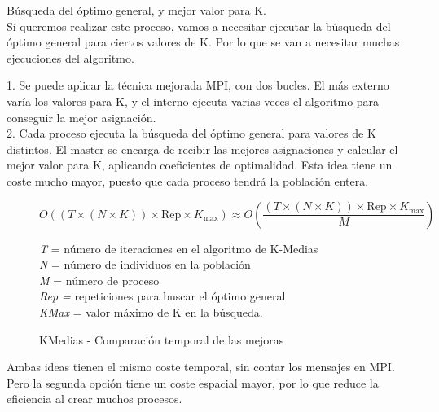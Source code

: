 		\vspace{0.2cm}
		
		\noindent Búsqueda del óptimo general, y mejor valor para K.\\
		Si queremos realizar este proceso, vamos a necesitar ejecutar la búsqueda del óptimo general para ciertos valores de K. Por lo que se van a necesitar muchas ejecuciones del algoritmo.
		
		\begin{flushleft}
			1. Se puede aplicar la técnica mejorada MPI, con dos bucles. El más externo varía los valores para K, y el interno ejecuta varias veces el algoritmo para conseguir la mejor asignación.\\
			2. Cada proceso ejecuta la búsqueda del óptimo general para valores de K distintos. El master se encarga de recibir las mejores asignaciones y calcular el mejor valor para K, aplicando coeficientes de optimalidad. Esta idea tiene un coste mucho mayor, puesto que cada proceso tendrá la población entera.
		\end{flushleft}
		
		\begin{figure}
			\begin{mdframed}[roundcorner=5pt]
				\[
				O((T \times (N \times K)) \times \text{Rep} \times K_{\text{max}}) \approx O\left(\frac{{(T \times (N \times K)) \times \text{Rep} \times K_{\text{max}}}}{{M}}\right)
				\]
				
				
				\begin{tcolorbox}[boxrule=0.5pt, fontupper=\small]
					
					\textit{T} = número de iteraciones en el algoritmo de K-Medias\\
					\textit{N} = número de individuos en la población\\
					\textit{M} = número de proceso\\
					\textit{Rep = }repeticiones para buscar el óptimo general\\
					\textit{KMax} = valor máximo de K en la búsqueda.				
					
				\end{tcolorbox}
				
			\end{mdframed}
			\caption{KMedias - Comparación temporal de las mejoras}
			\label{fig:KMedias_comp}
		\end{figure}
		
		Ambas ideas tienen el mismo coste temporal, sin contar los mensajes en MPI. Pero la segunda opción tiene un coste espacial mayor, por lo que reduce la eficiencia al crear muchos procesos.
		
